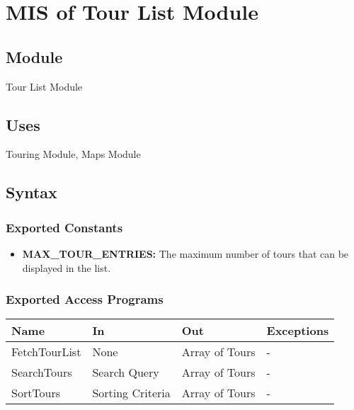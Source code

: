 \documentclass[12pt, titlepage]{article}
\begin{document}
\newpage

\section{MIS of Tour List Module} \label{TourListModule}

\subsection{Module}

Tour List Module

\subsection{Uses}

Touring Module, Maps Module

\subsection{Syntax}

\subsubsection{Exported Constants}

\begin{itemize}
  \item \textbf{MAX\_TOUR\_ENTRIES:} The maximum number of tours that can be displayed in the list.
\end{itemize}

\subsubsection{Exported Access Programs}

\begin{center}
  \begin{tabular}{p{4cm} p{4cm} p{4cm} p{4cm}}
    \hline
    \textbf{Name} & \textbf{In}      & \textbf{Out}   & \textbf{Exceptions} \\
    \hline
    FetchTourList & None             & Array of Tours & -                   \\
    \hline
    SearchTours   & Search Query     & Array of Tours & -                   \\
    \hline
    SortTours     & Sorting Criteria & Array of Tours & -                   \\
    \hline
  \end{tabular}
\end{center}
\end{document}
